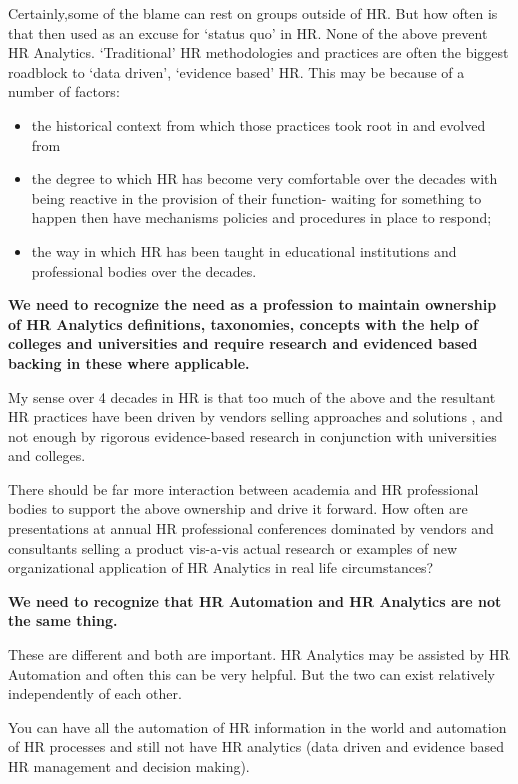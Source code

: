 \documentclass[12pt,letterpaper]{article}
\begin{document}
Certainly,some of the blame can rest on groups outside of HR. But how
often is that then used as an excuse for `status quo' in HR. None of the
above prevent HR Analytics. `Traditional' HR methodologies and practices
are often the biggest roadblock to `data driven', `evidence based' HR.
This may be because of a number of factors:

\begin{itemize}
\item
  the historical context from which those practices took root in and
  evolved from
\item
  the degree to which HR has become very comfortable over the decades
  with being reactive in the provision of their function- waiting for
  something to happen then have mechanisms policies and procedures in
  place to respond;
\item
  the way in which HR has been taught in educational institutions and
  professional bodies over the decades.
\end{itemize}

\textbf{We need to recognize the need as a profession to maintain
ownership of HR Analytics definitions, taxonomies, concepts with the
help of colleges and universities and require research and evidenced
based backing in these where applicable.}

My sense over 4 decades in HR is that too much of the above and the
resultant HR practices have been driven by vendors selling approaches
and solutions , and not enough by rigorous evidence-based research in
conjunction with universities and colleges.

There should be far more interaction between academia and HR
professional bodies to support the above ownership and drive it forward.
How often are presentations at annual HR professional conferences
dominated by vendors and consultants selling a product vis-a-vis actual
research or examples of new organizational application of HR Analytics
in real life circumstances?

\textbf{We need to recognize that HR Automation and HR Analytics are not
the same thing.}

These are different and both are important. HR Analytics may be assisted
by HR Automation and often this can be very helpful. But the two can
exist relatively independently of each other.

You can have all the automation of HR information in the world and
automation of HR processes and still not have HR analytics (data driven
and evidence based HR management and decision making).
\end{document}
